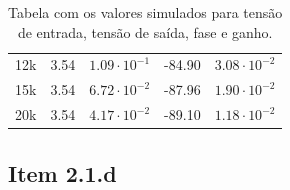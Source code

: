 \documentclass[11pt]{article}
\begin{document}
\begin{table}[h!]
\begin{tabular}{|c|c|c|c|c|}
    12k      & 3.54                  & $1.09 \cdot 10^{-1}$ & -84.90                                & $3.08 \cdot 10^{-2}$  \\
    15k      & 3.54                  & $6.72 \cdot 10^{-2}$ & -87.96                                & $1.90 \cdot 10^{-2}$  \\
    20k      & 3.54                  & $4.17 \cdot 10^{-2}$ & -89.10                                & $1.18 \cdot 10^{-2}$  \\
    \hline
  \end{tabular}
  \caption{Tabela com os valores simulados para tensão de entrada, tensão de saída, fase e ganho.}
  \label{tab:2-1-c}
\end{table}

\pagebreak

\subsection*{Item 2.1.d}
\end{document}
